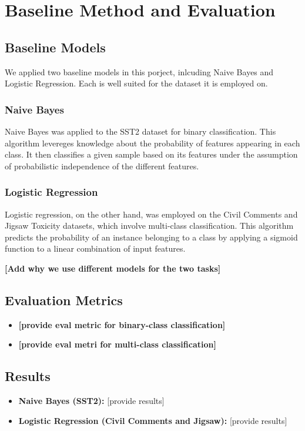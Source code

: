 \documentclass[10pt,a4paper,oneside]{article} %
\begin{document}
\section{Baseline Method and Evaluation}
\subsection{Baseline Models}

We applied two baseline models in this porject, inlcuding Naive Bayes and Logistic Regression. Each is well suited for the dataset it is employed on. 
\subsubsection{Naive Bayes}
Naive Bayes was applied to the SST2 dataset for binary classification.  This algorithm levereges knowledge about the probability of features appearing in each class. It then classifies a given sample based on its features under the assumption of probabilistic independence of the different features. 
\subsubsection{Logistic Regression}
 Logistic regression, on the other hand, was employed on the Civil Comments and Jigsaw Toxicity datasets, which involve multi-class classification. This algorithm predicts the probability of an instance belonging to a class by applying a sigmoid function to a linear combination of input features. 
 
 \textbf{[Add why we use different models for the two tasks]}
\subsection{Evaluation Metrics}
\begin{itemize}
    \item \textbf{[provide eval metric for binary-class classification]}
    \item \textbf{[provide eval metri for multi-class classification]}
\end{itemize}

\subsection{Results}
\begin{itemize}
    \item \textbf{Naive Bayes (SST2):} [provide results]
    \item \textbf{Logistic Regression (Civil Comments and Jigsaw):} [provide results]
\end{itemize}
\end{document}
